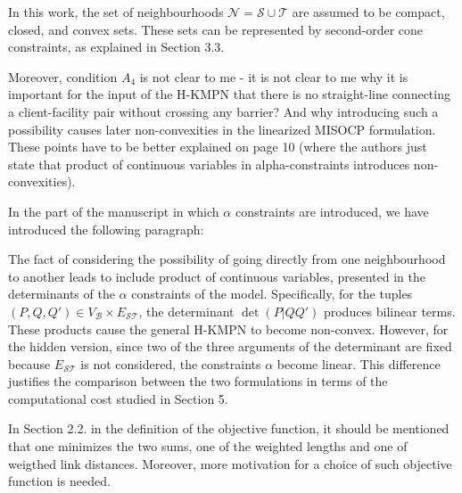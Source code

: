 \documentclass{article}
\newenvironment{reviewer}{\setcounter{pointcounter}{1}}{}
\newcommand{\point}{\text{{\selectfont \thepointcounter} \stepcounter{pointcounter}}}
\begin{document}
\begin{reviewer}
\begin{tcolorbox}[breakable,enhanced,coltitle=black,colback=green!5!white,colframe=green!75!black,title=\textbf{Answer R2.\point},borderline={1pt}{0pt}{black},boxrule=0pt]
			\medskip
			
			In this work, the set of neighbourhoods $\mathcal N=\mathcal S\cup\mathcal T$ are assumed to be compact, closed, and convex sets. These sets can be represented by second-order cone constraints, as explained in Section 3.3. 
		\end{tcolorbox}
		
		\begin{itshape}
			Moreover, condition $A_4$ is not clear to me - it is not clear to me why it is important for the input of the H-KMPN that there is no straight-line connecting a client-facility pair without crossing any barrier? And why introducing such a possibility causes later non-convexities in the linearized MISOCP formulation. These points have to be better explained on page 10 (where the authors just state that product of continuous variables in alpha-constraints introduces non-convexities).		
		\end{itshape}
	
		\begin{tcolorbox}[breakable,enhanced,coltitle=black,colback=green!5!white,colframe=green!75!black,title=\textbf{Answer R2.\point},borderline={1pt}{0pt}{black},boxrule=0pt]
			In the part of the manuscript in which $\alpha$ constraints are introduced, we have introduced the following paragraph:
			\medskip
			
			The fact of considering the possibility of going directly from one neighbourhood  to another leads to include product of continuous variables, presented in the determinants of the $\alpha$ constraints of the model. Specifically, for the tuples $(P, Q, Q')\in V_\mathcal B\times E_{\mathcal S\mathcal T}$, the determinant $\det(P|QQ')$ produces bilinear terms. These products cause the general H-KMPN to become non-convex. However, for the hidden version, since two of the three arguments of the determinant are fixed because $E_{\mathcal S\mathcal T}$ is not considered, the constraints $\alpha$ become linear. This difference justifies the comparison between the two formulations in terms of the computational cost studied in Section 5.
		\end{tcolorbox}
	
		\begin{itshape}
			In Section 2.2. in the definition of the objective function, it should be mentioned that one minimizes the two sums, one of the weighted lengths and one of weigthed link distances. Moreover, more motivation for a choice of such objective function is needed.
		\end{itshape}
		

\end{reviewer}
\end{document}
